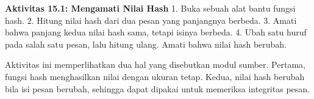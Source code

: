 \begin{obeactivity}
\textbf{Aktivitas 15.1: Mengamati Nilai Hash}
1. Buka sebuah alat bantu fungsi hash.
2. Hitung nilai hash dari dua pesan yang panjangnya berbeda.
3. Amati bahwa panjang kedua nilai hash sama, tetapi isinya berbeda.
4. Ubah satu huruf pada salah satu pesan, lalu hitung ulang. Amati bahwa nilai
   hash berubah.
\end{obeactivity}

Aktivitas ini memperlihatkan dua hal yang disebutkan modul sumber. Pertama, fungsi
hash menghasilkan nilai dengan ukuran tetap. Kedua, nilai hash berubah bila isi
pesan berubah, sehingga dapat dipakai untuk memeriksa integritas pesan.
